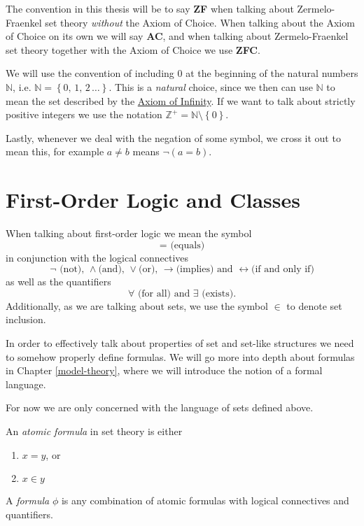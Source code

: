 \documentclass[../../main.tex]{subfiles}
\begin{document}
The convention in this thesis will be to say \textbf{ZF} when talking about Zermelo-Fraenkel set theory \textit{without} the Axiom of Choice.
When talking about the Axiom of Choice on its own we will say \textbf{AC}, and when talking about Zermelo-Fraenkel set theory together with the Axiom of Choice we use \textbf{ZFC}.

We will use the convention of including $0$ at the beginning of the natural numbers $\mathbb{N}$, i.e. $\mathbb{N} = \left\{0, \, 1, \, 2\, \ldots\right\}$.
This is a \textit{natural} choice, since we then can use $\mathbb{N}$ to mean the set described by the \hyperref[ZF7]{Axiom of Infinity}.
If we want to talk about strictly positive integers we use the notation $\mathbb{Z}^+ = \mathbb{N}\setminus\left\{0\right\}$.

Lastly, whenever we deal with the negation of some symbol, we cross it out to mean this, for example $a \neq b$ means $\lnot \left(a = b\right)$.

\section{First-Order Logic and Classes}
When talking about first-order logic we mean the symbol $$= \text{ (equals)}$$ in conjunction with the logical connectives
$$\lnot \text{ (not), } \wedge \text{(and), } \vee \text{(or), } \rightarrow \text{(implies) and } \leftrightarrow \text{(if and only if)}$$
as well as the quantifiers $$\forall \text{ (for all) and } \exists \text{ (exists)}.$$
Additionally, as we are talking about sets, we use the symbol $\in$ to denote set inclusion. \cite[pp.2-3]{Jec78}

In order to effectively talk about properties of set and set-like structures we need to somehow properly define formulas.
We will go more into depth about formulas in Chapter \ref{model-theory}, where we will introduce the notion of a formal language.

For now we are only concerned with the language of sets defined above.

\begin{definition}
    An \textit{atomic formula} in set theory is either
    \begin{enumerate}
        \item $x = y$, or
        \item $x \in y$
    \end{enumerate}
    A \textit{formula} $\phi$ is any combination of atomic formulas with logical connectives and quantifiers.
\end{definition}
\end{document}
